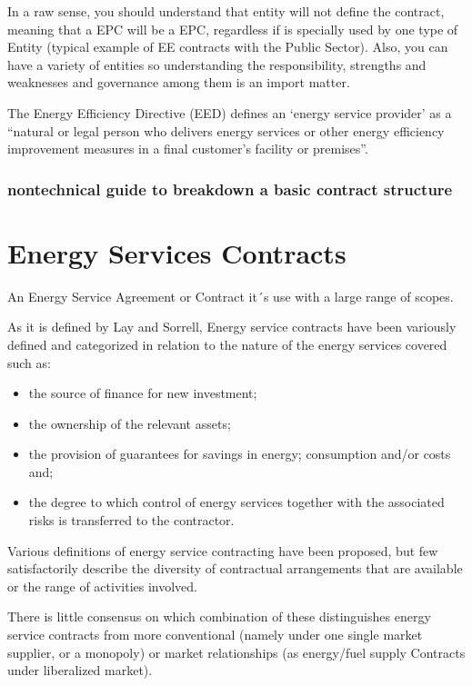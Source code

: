 \documentclass[]{book}
\theoremstyle{definition}
\theoremstyle{definition}
\theoremstyle{definition}
\theoremstyle{remark}
\begin{document}
In a raw sense, you should understand that entity will not define the
contract, meaning that a EPC will be a EPC, regardless if is specially
used by one type of Entity (typical example of EE contracts with the
Public Sector). Also, you can have a variety of entities so
understanding the responsibility, strengths and weaknesses and
governance among them is an import matter.

The Energy Efficiency Directive (EED) defines an `energy service
provider' as a ``natural or legal person who delivers energy services or
other energy efficiency improvement measures in a final customer's
facility or premises''.

\subsubsection{nontechnical guide to breakdown a basic contract
structure}\label{nontechnical-guide-to-breakdown-a-basic-contract-structure}

\section{Energy Services Contracts}\label{energy-services-contracts}

An Energy Service Agreement or Contract it´s use with a large range of
scopes.

As it is defined by Lay and Sorrell, Energy service contracts have been
variously defined and categorized in relation to the nature of the
energy services covered such as:

\begin{itemize}
\item
  the source of finance for new investment;
\item
  the ownership of the relevant assets;
\item
  the provision of guarantees for savings in energy; consumption and/or
  costs and;
\item
  the degree to which control of energy services together with the
  associated risks is transferred to the contractor.
\end{itemize}

Various definitions of energy service contracting have been proposed,
but few satisfactorily describe the diversity of contractual
arrangements that are available or the range of activities involved.

There is little consensus on which combination of these distinguishes
energy service contracts from more conventional (namely under one single
market supplier, or a monopoly) or market relationships (as energy/fuel
supply Contracts under liberalized market).
\end{document}
